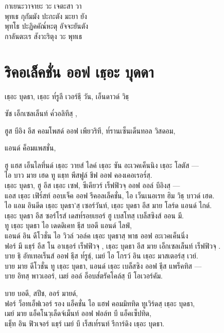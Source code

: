 \begin{english}
\end{english}

กาเยนะวาจายะ วะ เจตะสา วา\\
พุทเธ กุกัมมัง ปะกะตัง มะยา ยัง\\
พุทโธ ปะฏิคคัณ๎หะตุ อัจจะยันตัง\\
กาลันตะเร สังวะริตุง วะ พุทเธ

\chapter{ริคอเล็คชั่น ออฟ เธฺอะ บุดดา}

\begin{leader}
\end{leader}
เธฺอะ บุดธา, เธฺอะ ท๎รูลี เวอร์ธฺี วัน, เอ็นดาวด์ วิธฺ\\

\begin{english}
	ซัช เอ็กเซลเล็นท์ ค๎วอลิทีสฺ ,\\
\end{english}

ฮูส บีอิง อีส คอมโพสด์ ออฟ เพียวริที, ท๎รานเซ็นเด็นทอล วิสดอม,\\

\begin{english}
	แอนด์ ค็อมแพสชั่น,\\
\end{english}

ฮู แฮส เอ็นไลทึ่นด์ เธฺอะ วายส์ ไลค์ เธฺอะ ซัน อะเวคเค็นนิง เธฺอะ โลตัส —\\
ไอ บาว มาย เฮด ทู แธฺท พีสฟูล์ ชีฟ ออฟ คองเคอเรอร๎สฺ.\\
เธฺอะ บุดธา, ฮู อีส เธฺอะ เซฟ, ซีเคียวร์ เร็ฟฟิวจฺ  ออฟ ออล์ บีอิงสฺ —\\
แอส เธฺอะ เฟิร๎สท์ ออบเจ็ค ออฟ รีคอลเล็คชั่น, ไอ เว็นเนอเรท ฮิม วิธฺ บาวด์ เฮด.\\
ไอ แอม อินดีด เธฺอะ บุดธา’สฺ เซอร์วันท์, เธฺอะ บุดธา อีส มาย โลร์ด แอนด์ ไกด์.\\
เธฺอะ บุดธา อีส ซอร์โรส์ เดสท๎รอยเยอร์ ฮู   เบสโทสฺ  เบล็สซิงส์ ออน มี.\\
ทู เธฺอะ บุดธา ไอ เดดดิเคท ธฺีส บอดี แอนด์ ไลฟ์,\\
แอนด์ อิน ดีโวชั่น ไอ วิวล์ วอล์ค เธฺอะ บุดธาสฺ  พาธ ออฟ อะเวคเค็นนิ่ง\\
ฟอร์ มี แธฺร์ อีส โน อาเธฺอร์ เร็ฟฟิวจฺ , เธฺอะ บุดธา อีส มาย เอ็กเซลเล็นท์ เร็ฟฟิวจฺ .\\
บาย ธฺิ อัทเทอเร็นส์ ออฟ ธฺีส ท๎รูธฺ์, เมย์ ไอ โกรว์ อิน เธฺอะ มาสเตอร์สฺ  เวย์.\\
บาย มาย ดีโวชั่น ทู เธฺอะ บุดธา, แอนด์ เธฺอะ เบล็สซิง ออฟ ธฺีส แพร็คทิส —\\
บาย อิทสฺ  พาวเออร์, เมย์ ออล์ อ็อบส๎ตรัคโคล์สฺ บี โอเวอร์คัม.\\

\begin{english}
\end{english}

บาย บอดี, สปีช, ออร์ มายด์,\\
ฟอร์ ว็อทเอ็ฟเวอร์ รอง แอ็คชั่น ไอ แฮฟ คอมมิททิด ทูเวิร์ดสฺ  เธฺอะ บุดธา,\\
เมย์ มาย แอ็คโนวฺเล็ดจ์เม็นท์ ออฟ ฟอล์ท บี แอ็คเซ็ปทิด,\\
แธฺ็ท อิน ฟิวเจอร์ แธฺร์ เมย์ บี เร็สเท๎รนท์ รีการ์ดิง เธฺอะ บุดธา.\\

